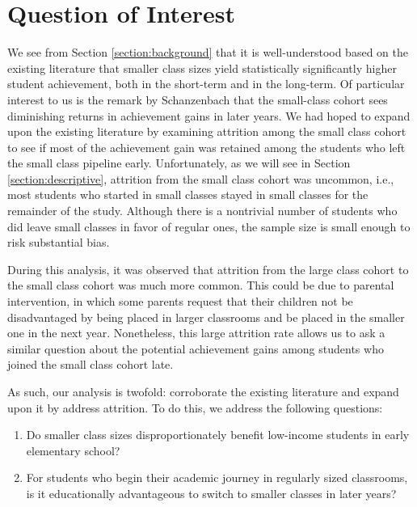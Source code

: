 \documentclass[11pt]{article}
\begin{document}
\section{Question of Interest}\par
\label{section:question}
We see from Section \ref{section:background} that it is well-understood based on the existing literature that smaller class sizes yield statistically significantly higher student achievement, both in the short-term and in the long-term. Of particular interest to us is the remark by Schanzenbach \cite{schanzenbach2007_project_star} that the small-class cohort sees diminishing returns in achievement gains in later years.  We had hoped to expand upon the existing literature by examining attrition among the small class cohort to see if most of the achievement gain was retained among the students who left the small class pipeline early. Unfortunately, as we will see in Section \ref{section:descriptive}, attrition from the small class cohort was uncommon, i.e., most students who started in small classes stayed in small classes for the remainder of the study. Although there is a nontrivial number of students who did leave small classes in favor of regular ones, the sample size is small enough to risk substantial bias.

During this analysis, it was observed that attrition from the large class cohort to the small class cohort was much more common. This could be due to parental intervention, in which some parents request that their children not be disadvantaged by being placed in larger classrooms and be placed in the smaller one in the next year. Nonetheless, this large attrition rate allows us to ask a similar question about the potential achievement gains among students who joined the small class cohort late.

As such, our analysis is twofold: corroborate the existing literature and expand upon it by address attrition. To do this, we address the following questions:

\begin{enumerate}
    \item Do smaller class sizes disproportionately benefit low-income students in early elementary school?
    \item For students who begin their academic journey in regularly sized classrooms, is it educationally advantageous to switch to smaller classes in later years?
\end{enumerate}
\end{document}
